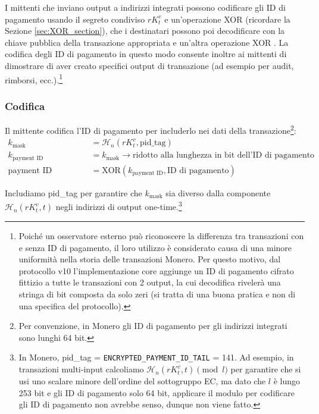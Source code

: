 I mittenti che inviano output a indirizzi integrati possono codificare gli ID di pagamento usando il segreto condiviso $r K_t^v$ e un’operazione XOR (ricordare la Sezione \ref{sec:XOR_section}), che i destinatari possono poi decodificare con la chiave pubblica della transazione appropriata e un’altra operazione XOR \cite{integrated-addresses}. La codifica degli ID di pagamento in questo modo consente inoltre ai mittenti di dimostrare di aver creato specifici output di transazione (ad esempio per audit, rimborsi, ecc.).\footnote{Poiché un osservatore esterno può riconoscere la differenza tra transazioni con e senza ID di pagamento, il loro utilizzo è considerato causa di una minore uniformità nella storia delle transazioni Monero. Per questo motivo, dal protocollo v10 l’implementazione core aggiunge un ID di pagamento cifrato fittizio a tutte le transazioni con 2 output, la cui decodifica rivelerà una stringa di bit composta da solo zeri (si tratta di una buona pratica e non di una specifica del protocollo).}

\subsubsection*{Codifica}

Il mittente codifica l’ID di pagamento per includerlo nei dati della transazione\footnote{Per convenzione, in Monero gli ID di pagamento per gli indirizzi integrati sono lunghi 64 bit.}:\vspace{.175cm}
\begin{align*}
         k_{\textrm{mask}} &= \mathcal{H}_n(r K_t^v,\textrm{pid\_tag}) \\
      k_{\textrm{payment ID}} &= k_{\textrm{mask}} \rightarrow \textrm{ridotto alla lunghezza in bit dell’ID di pagamento}\\
  \textrm{payment ID codificato} &= \textrm{XOR}(k_{\textrm{payment ID}}, \textrm{ID di pagamento})
\end{align*}

Includiamo pid\_tag per garantire che $k_{\textrm{mask}}$ sia diverso dalla componente $\mathcal{H}_n(r K_t^v, t)$ negli indirizzi di output one-time.\footnote{In Monero, pid\_tag = {\tt ENCRYPTED\_PAYMENT\_ID\_TAIL} = 141. Ad esempio, in transazioni multi-input calcoliamo $\mathcal{H}_n(r K_t^v, t) \pmod l$ per garantire che si usi uno scalare minore dell’ordine del sottogruppo EC, ma dato che $l$ è lungo 253 bit e gli ID di pagamento solo 64 bit, applicare il modulo per codificare gli ID di pagamento non avrebbe senso, dunque non viene fatto.}

